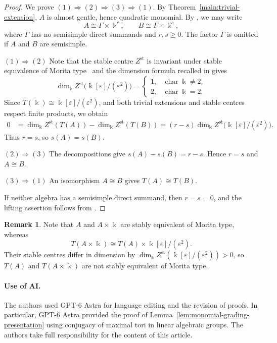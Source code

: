 \documentclass[11pt]{article}
\theoremstyle{definition}
\newtheorem{remark}[theorem]{Remark}
\begin{document}
	\begin{proof}
		We prove $(1)\Rightarrow(2)\Rightarrow(3)\Rightarrow(1)$.
		By Theorem~\ref{main:trivial-extension}, $A$ is almost gentle, hence quadratic monomial.
		By \cite[Theorem~4.15(1)]{CX26}, we may write
		\[
			A\cong \Gamma\times\Bbbk^r,
			\qquad B\cong \Gamma\times\Bbbk^s,
		\]
		where $\Gamma$ has no semisimple direct summands and $r,s\geq0$.
		The factor $\Gamma$ is omitted if $A$ and $B$ are semisimple.

		\smallskip
		\noindent\underline{$(1)\Rightarrow(2)$}\quad
		Note that the stable centre $Z^{\mathrm{st}}$ is invariant under stable equivalence of Morita type~\cite[Proposition~5.4]{Broue94} and the dimension formula recalled in \cite[Section~3]{LZZ17} gives
		\[
			\dim_\Bbbk Z^{\mathrm{st}}\bigl(\Bbbk[\varepsilon]/(\varepsilon^2)\bigr)
			=\begin{cases}
				1,&\operatorname{char}\Bbbk\neq2,\\
				2,&\operatorname{char}\Bbbk=2.
			\end{cases}
		\]
		Since $T(\Bbbk)\cong\Bbbk[\varepsilon]/(\varepsilon^2)$, and both trivial extensions and stable centres respect finite products, we obtain
		\[
			\begin{aligned}
				0
				&=\dim_\Bbbk Z^{\mathrm{st}}(T(A))
				-\dim_\Bbbk Z^{\mathrm{st}}(T(B))=(r-s)\dim_\Bbbk Z^{\mathrm{st}}
				\bigl(\Bbbk[\varepsilon]/(\varepsilon^2)\bigr).
			\end{aligned}
		\]
		Thus $r=s$, so $s(A)=s(B)$.

		\smallskip
		\noindent\underline{$(2)\Rightarrow(3)$}\quad
		The decompositions give $s(A)-s(B)=r-s$.
		Hence $r=s$ and $A\cong B$.

		\smallskip
		\noindent\underline{$(3)\Rightarrow(1)$}\quad
		An isomorphism $A\cong B$ gives $T(A)\cong T(B)$.

		If neither algebra has a semisimple direct summand, then $r=s=0$, and the lifting assertion follows from \cite[Theorem~4.15(1)]{CX26}.
	\end{proof}

	\begin{remark}
		Note that $A$ and $A\times\Bbbk$ are stably equivalent of Morita type, whereas
		\[
			T(A\times\Bbbk)\cong T(A)\times \Bbbk[\varepsilon]/(\varepsilon^2).
		\]
		Their stable centres differ in dimension by $\dim_\Bbbk Z^{\mathrm{st}}(\Bbbk[\varepsilon]/(\varepsilon^2))>0$, so $T(A)$ and $T(A\times\Bbbk)$ are not stably equivalent of Morita type. 
	\end{remark}

	\paragraph{Use of AI.}
		The authors used GPT-6 Astra for language editing and the revision of proofs.
		In particular, GPT-6 Astra provided the proof of Lemma~\ref{lem:monomial-grading-presentation} using conjugacy of maximal tori in linear algebraic groups.
		The authors take full responsibility for the content of this article.

	\begingroup\linespread{1}\selectfont
		
		
	\endgroup
\end{document}
